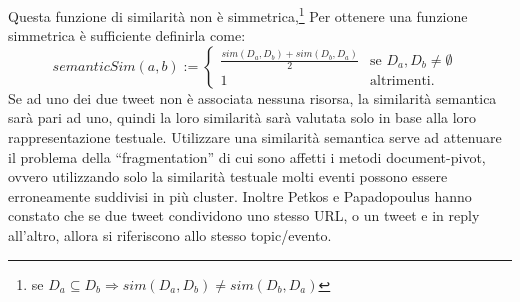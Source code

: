 \documentclass[a4paper,12pt]{report}
\begin{document}
Questa funzione di similarità non è simmetrica,\footnote{se $D_a\subseteq D_b\Rightarrow sim(D_a,D_b)\neq sim(D_b,D_a) $}
Per ottenere una funzione simmetrica è sufficiente definirla come: 
\begin{equation*} 
semanticSim(a,b):= 
\begin{cases}
\frac{sim(D_a,D_b)+sim(D_b,D_a)}{2} & \text{se $D_a,D_b\neq \emptyset$ }\\
1& \text{altrimenti.}

\end{cases}
\end{equation*}
Se ad uno dei due tweet non è associata nessuna risorsa, la similarità semantica sarà pari ad uno, quindi la loro similarità sarà valutata  solo in base alla loro rappresentazione testuale.
Utilizzare una similarità semantica serve ad attenuare il problema della “fragmentation” di cui sono affetti i metodi document-pivot, ovvero utilizzando solo la similarità testuale molti eventi possono essere erroneamente suddivisi in più cluster.  Inoltre Petkos e Papadopoulus \cite{DBLP:conf/www/PetkosPK14}  hanno constato che se due tweet condividono uno stesso URL, o  un tweet e in reply all’altro, allora si riferiscono allo stesso topic/evento.
 
\end{document}
